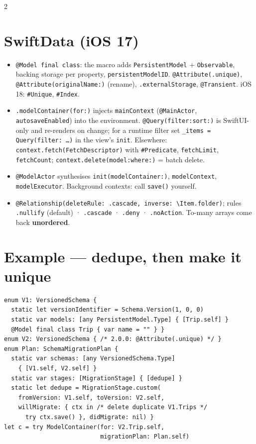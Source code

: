 \documentclass[8pt]{extarticle}
\begin{document}
\begin{multicols}{2}
\section{SwiftData (iOS 17)}
\begin{itemize}
  \item \texttt{@Model final class}: the macro adds \texttt{PersistentModel} +
        \texttt{Observable}, backing storage per property, \texttt{persistentModelID}.
        \texttt{@Attribute(.unique)}, \texttt{@Attribute(originalName:)} (rename),
        \texttt{.externalStorage}, \texttt{@Transient}. iOS 18: \texttt{\#Unique},
        \texttt{\#Index}.
  \item \texttt{.modelContainer(for:)} injects \texttt{mainContext}
        (\texttt{@MainActor}, \texttt{autosaveEnabled}) into the environment.
        \texttt{@Query(filter:sort:)} is SwiftUI-only and re-renders on change; for a
        runtime filter set \texttt{\_items = Query(filter: …)} in the view's
        \texttt{init}. Elsewhere: \texttt{context.fetch(FetchDescriptor)} with
        \texttt{\#Predicate}, \texttt{fetchLimit}, \texttt{fetchCount};
        \texttt{context.delete(model:where:)} = batch delete.
  \item \texttt{@ModelActor} synthesises \texttt{init(modelContainer:)},
        \texttt{modelContext}, \texttt{modelExecutor}. Background contexts: call
        \texttt{save()} yourself.
  \item \texttt{@Relationship(deleteRule: .cascade, inverse: \textbackslash Item.folder)};
        rules \texttt{.nullify} (default) · \texttt{.cascade} · \texttt{.deny} ·
        \texttt{.noAction}. To-many arrays come back \textbf{unordered}.
\end{itemize}

\section{Example — dedupe, then make it unique}
\begin{lstlisting}[language=SwiftSheet]
enum V1: VersionedSchema {
  static let versionIdentifier = Schema.Version(1, 0, 0)
  static var models: [any PersistentModel.Type] { [Trip.self] }
  @Model final class Trip { var name = "" } }
enum V2: VersionedSchema { /* 2.0.0: @Attribute(.unique) */ }
enum Plan: SchemaMigrationPlan {
  static var schemas: [any VersionedSchema.Type]
    { [V1.self, V2.self] }
  static var stages: [MigrationStage] { [dedupe] }
  static let dedupe = MigrationStage.custom(
    fromVersion: V1.self, toVersion: V2.self,
    willMigrate: { ctx in /* delete duplicate V1.Trips */
      try ctx.save() }, didMigrate: nil) }
let c = try ModelContainer(for: V2.Trip.self,
                           migrationPlan: Plan.self)
\end{lstlisting}


\end{multicols}
\end{document}
